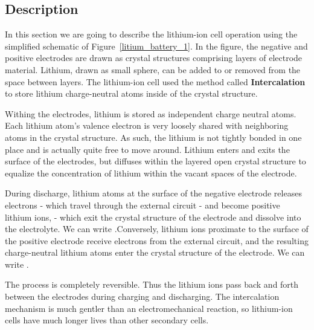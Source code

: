 \documentclass[12pt,a4paper]{scrartcl}
\begin{document}
\begin{onehalfspace}
\section{Description}
In this section we are going to describe the lithium-ion cell operation using the simplified schematic of Figure~\ref{litium_battery_1}. In the figure, the negative and positive electrodes are drawn as crystal structures comprising layers of electrode material. Lithium, drawn as small sphere, can be added to or removed from the space between layers. The lithium-ion cell used the method called \textbf{Intercalation} to store lithium charge-neutral atoms inside of the crystal structure.

Withing the electrodes, lithium is stored as independent charge neutral atoms. Each lithium atom's valence electron is very loosely shared with neighboring atoms in the crystal structure. As such, the lithium is not tightly bonded in one place and is actually quite free to move around. Lithium enters and exits the surface of the electrodes, but diffuses within the layered open crystal structure to equalize the concentration of lithium within the vacant spaces of the electrode.

During discharge, lithium atoms at the surface of the negative electrode releases electrons - which travel through the external circuit - and become positive lithium ions,  - which exit the crystal structure of the electrode and dissolve into the electrolyte. We can write .Conversely, lithium ions proximate to the surface of the positive electrode receive electrons from the external circuit, and the resulting charge-neutral lithium atoms enter the crystal structure of the electrode. We can write .

The process is completely reversible. Thus the lithium ions pass back and forth between the electrodes during charging and discharging. The intercalation mechanism is much gentler than an electromechanical reaction, so lithium-ion cells have much longer lives than other secondary cells.


\end{onehalfspace}
\end{document}
